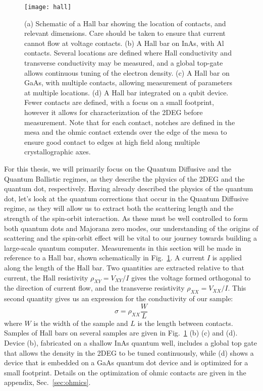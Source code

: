 \begin{figure}
  \texttt{[image: hall]}
  \caption[Schematic of a Hall bar and several devices]
  {\label{fig:hall}(a) Schematic of a Hall bar showing the location of contacts, and relevant dimensions. Care should be taken to ensure that current cannot flow at voltage contacts. (b) A Hall bar on InAs, with Al contacts. Several locations are defined where Hall conductivity and transverse conductivity may be measured, and a global top-gate allows continuous tuning of the electron density. (c) A Hall bar on GaAs, with multiple contacts, allowing measurement of parameters at multiple locations. (d) A Hall bar integrated on a qubit device. Fewer contacts are defined, with a focus on a small footprint, however it allows for characterization of the 2DEG before measurement. Note that for each contact, notches are defined in the mesa and the ohmic contact extends over the edge of the mesa to ensure good contact to edges at high field along multiple crystallographic axes.}
\end{figure}

For this thesis, we will primarily focus on the Quantum Diffusive and the Quantum Ballistic regimes, as they describe the physics of the
2DEG and the quantum dot, respectively. Having already described the physics of the quantum dot, let's look at the quantum corrections that occur
in the Quantum Diffusive regime, as they will allow us to extract both the scattering length and the strength of the spin-orbit interaction. As these must be well controlled to form both quantum dots and Majorana zero modes, our understanding of the origins of
scattering and the spin-orbit effect will be vital to our journey towards building a large-scale quantum computer. Measurements in this section
will be made in reference to a Hall bar, shown schematically in Fig.~\ref{fig:hall}. A current $I$ is applied along the length of the Hall bar.
Two quantities are extracted relative to that current, the Hall resistivity $\rho_{XY} = V_{XY}/I$ gives
the voltage formed orthogonal to the direction of current flow, and the transverse resistivity $\rho_{XX} = V_{XX}/I$.
This second quantity gives us an expression for the conductivity of our sample:
\begin{equation}
  \sigma = \rho_{XX} \frac{W}{L}
\end{equation}
where $W$ is the width of the sample and $L$ is the length between contacts. Samples of Hall bars on several samples are given in Fig.~\ref{fig:hall} (b)
(c) and (d). Device (b), fabricated on a shallow InAs quantum well, includes a global top gate that allows the density in the 2DEG to be tuned continuously,
while (d) shows a device that is embedded on a GaAs quantum dot device and is optimized for a small footprint. Details on the optimization of ohmic contacts
are given in the appendix, Sec.~\ref{sec:ohmics}.

